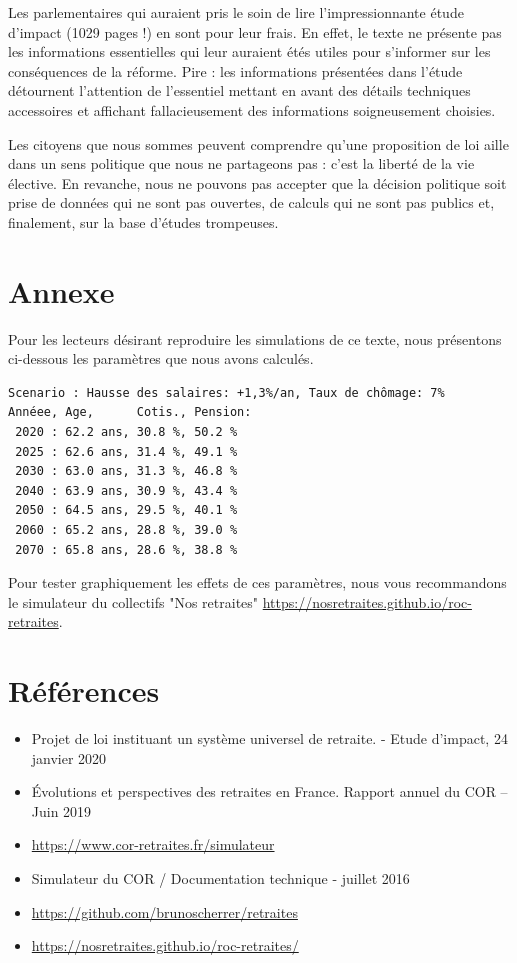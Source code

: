 \documentclass[10pt]{article}
\begin{document}
Les parlementaires qui auraient pris le soin de lire l'impressionnante 
étude d'impact (1029 pages !) en sont pour leur frais. 
En effet, le texte ne présente pas les informations essentielles qui leur auraient étés 
utiles pour s'informer sur les conséquences de la réforme. 
Pire : les informations présentées dans l'étude détournent l'attention de l'essentiel 
mettant en avant des détails techniques accessoires et affichant fallacieusement 
des informations soigneusement choisies. 

Les citoyens que nous sommes peuvent comprendre qu'une proposition de loi 
aille dans un sens politique que nous ne partageons pas : c'est la 
liberté de la vie élective. 
En revanche, nous ne pouvons pas accepter que la décision politique soit 
prise de données qui ne sont pas ouvertes, 
de calculs qui ne sont pas publics et, finalement, sur la base d'études trompeuses. 


\section{Annexe}

Pour les lecteurs désirant reproduire les simulations de ce texte, 
nous présentons ci-dessous les paramètres que nous avons calculés.
\begin{verbatim}
Scenario : Hausse des salaires: +1,3%/an, Taux de chômage: 7%
Annéee, Age,      Cotis., Pension:
 2020 : 62.2 ans, 30.8 %, 50.2 %
 2025 : 62.6 ans, 31.4 %, 49.1 %
 2030 : 63.0 ans, 31.3 %, 46.8 %
 2040 : 63.9 ans, 30.9 %, 43.4 %
 2050 : 64.5 ans, 29.5 %, 40.1 %
 2060 : 65.2 ans, 28.8 %, 39.0 %
 2070 : 65.8 ans, 28.6 %, 38.8 %
\end{verbatim}

Pour tester graphiquement les effets de ces paramètres, nous vous recommandons le 
simulateur du collectifs "Nos retraites" \url{https://nosretraites.github.io/roc-retraites}. 


\section{Références}

\begin{itemize}
\item Projet de loi instituant un système universel de retraite. - Etude d'impact, 24 janvier 2020
\item Évolutions et perspectives des retraites en France. Rapport annuel du COR – Juin 2019
\item \url{https://www.cor-retraites.fr/simulateur}
\item Simulateur du COR / Documentation technique - juillet 2016
\item \url{https://github.com/brunoscherrer/retraites}
\item \url{https://nosretraites.github.io/roc-retraites/}
\end{itemize}
\end{document}
